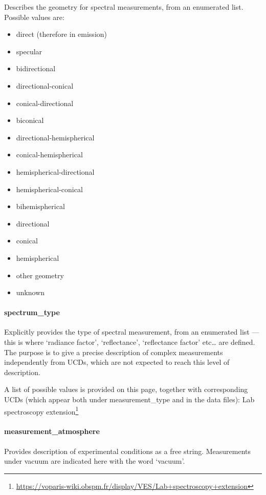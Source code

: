 \documentclass[11pt,a4paper]{ivoa}
\begin{document}
Describes the geometry for spectral measurements, from an enumerated list.
Possible values are:

\begin{itemize}
\item direct (therefore in emission)
\item specular
\item bidirectional
\item directional-conical
\item conical-directional
\item biconical
\item directional-hemispherical
\item conical-hemispherical
\item hemispherical-directional
\item hemispherical-conical
\item bihemispherical
\item directional
\item conical
\item hemispherical
\item other geometry
\item unknown
\end{itemize}

\paragraph{spectrum\_type}

Explicitly provides the type of spectral measurement, from an enumerated
list --- this is where `radiance factor', `reflectance', `reflectance
factor' etc… are defined. The purpose is to give a precise description
of complex measurements independently from UCDs, which are not expected
to reach this level of description.

A list of possible values is provided on this page,
together with corresponding UCDs (which appear both under
measurement\_type and in the data files): Lab spectroscopy
extension\footnote{\url{https://voparis-wiki.obspm.fr/display/VES/Lab+spectroscopy+extension}}

\paragraph{measurement\_atmosphere}

Provides description of experimental conditions as a free string.
Measurements under vacuum are indicated here with the word `vacuum'.
\end{document}
